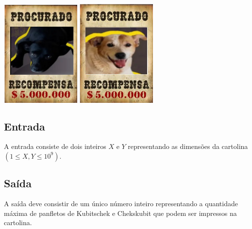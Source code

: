 \begin{center}
    \includegraphics[width=0.3\textwidth]{a_dupla_do_crime/kubitschek.png}
    \hspace{1cm}
    \includegraphics[width=0.3\textwidth]{a_dupla_do_crime/chekskubit.png}
\end{center}

\subsection*{Entrada}
A entrada consiste de dois inteiros $X$ e $Y$ representando as dimensões da cartolina $(1 \leq X, Y \leq 10^9)$.

\subsection*{Saída}
A saída deve consistir de um único número inteiro representando a quantidade máxima de panfletos de Kubitschek e Chekskubit que podem ser impressos na cartolina.
